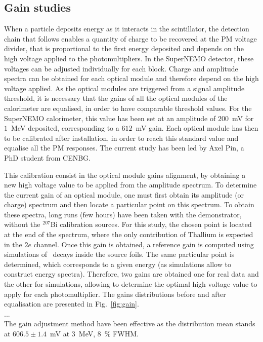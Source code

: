 \subsection{Gain studies}


When a particle deposits energy as it interacts in the scintillator, the detection chain that follows enables a quantity of charge to be recovered at the PM voltage divider, that is proportional to the first energy deposited and depends on the high voltage applied to the photomultipliers.
In the SuperNEMO detector, these voltages can be adjusted individually for each block.
Charge and amplitude spectra can be obtained for each optical module and therefore depend on the high voltage applied.
As the optical modules are triggered from a signal amplitude threshold, it is necessary that the gains of all the optical modules of the calorimeter are equalised, in order to have comparable threshold values.
For the SuperNEMO calorimeter, this value has been set at an amplitude of $200$~mV for $1$~MeV deposited, corresponding to a $612$~mV gain.
Each optical module has then to be calibrated after installation, in order to reach this standard value and equalise all the PM responses.
The current study has been led by Axel Pin, a PhD student from CENBG.

This calibration consist in the optical module gains alignment, by obtaining a new high voltage value to be applied from the amplitude spectrum.
To determine the current gain of an optical module, one must first obtain its amplitude (or charge) spectrum and then locate a particular point on this spectrum.
To obtain these spectra, long runs (few hours) have been taken with the demonstrator, without the $^{207}$Bi calibration sources.
For this study, the chosen point is located at the end of the spectrum, where the only contribution of Thallium is expected in the $2e$ channel.
Once this gain is obtained, a reference gain is computed using simulations of \Tl\ decays inside the source foils.
The same particular point is determined, which corresponds to a given energy (as simulations allow to construct energy spectra).
Therefore, two gains are obtained one for real data and the other for simulations, allowing to determine the optimal high voltage value to apply for each photomultiplier.
The gains distributions before and after equalisation are presented in Fig.~\ref{fig:gain}.
\\...\\
The gain adjustment method have been effective as the distribution mean stands at $606.5\pm1.4$~mV at $3$~MeV, $8$~\% FWHM.

